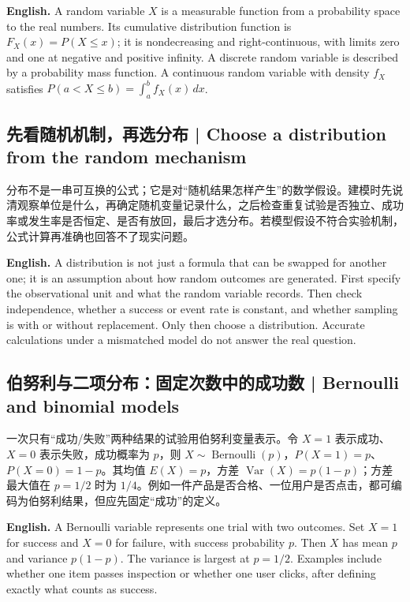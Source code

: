 \documentclass[UTF8,11pt,a4paper]{ctexart}
\newcommand{\EN}[1]{\par\noindent\textbf{English.} #1\par}
\begin{document}
\EN{A random variable $X$ is a measurable function from a probability space to the real numbers. Its cumulative distribution function is $F_X(x)=P(X\le x)$; it is nondecreasing and right-continuous, with limits zero and one at negative and positive infinity. A discrete random variable is described by a probability mass function. A continuous random variable with density $f_X$ satisfies $P(a<X\le b)=\int_a^b f_X(x)\,dx$.}

\subsection{先看随机机制，再选分布 | Choose a distribution from the random mechanism}
分布不是一串可互换的公式；它是对“随机结果怎样产生”的数学假设。建模时先说清观察单位是什么，再确定随机变量记录什么，之后检查重复试验是否独立、成功率或发生率是否恒定、是否有放回，最后才选分布。若模型假设不符合实验机制，公式计算再准确也回答不了现实问题。
\EN{A distribution is not just a formula that can be swapped for another one; it is an assumption about how random outcomes are generated. First specify the observational unit and what the random variable records. Then check independence, whether a success or event rate is constant, and whether sampling is with or without replacement. Only then choose a distribution. Accurate calculations under a mismatched model do not answer the real question.}

\subsection{伯努利与二项分布：固定次数中的成功数 | Bernoulli and binomial models}
一次只有“成功/失败”两种结果的试验用伯努利变量表示。令 $X=1$ 表示成功、$X=0$ 表示失败，成功概率为 $p$，则 $X\sim\operatorname{Bernoulli}(p)$，$P(X=1)=p$、$P(X=0)=1-p$。其均值 $E(X)=p$，方差 $\operatorname{Var}(X)=p(1-p)$；方差最大值在 $p=1/2$ 时为 $1/4$。例如一件产品是否合格、一位用户是否点击，都可编码为伯努利结果，但应先固定“成功”的定义。
\EN{A Bernoulli variable represents one trial with two outcomes. Set $X=1$ for success and $X=0$ for failure, with success probability $p$. Then $X$ has mean $p$ and variance $p(1-p)$. The variance is largest at $p=1/2$. Examples include whether one item passes inspection or whether one user clicks, after defining exactly what counts as success.}
\end{document}
